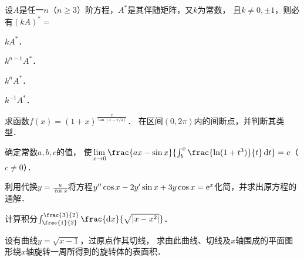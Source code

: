 \documentclass[plain,noanswer,medmath]{../../template/jnuexam}
\begin{document}
\begin{problem}
设$A$是任一$n$（$n \ge 3$）阶方程，$A^*$是其伴随矩阵，又$k$为常数，
且$k \ne 0, \pm 1$，则必有$(kA)^* =$\pickout{}
\begin{abcd}
\item $kA^*$．
\item $k^{n - 1}A^*$．
\item $k^n A^*$．
\item $k^{-1}A^*$．
\end{abcd}
\end{problem}



\begin{problem}
求函数$f(x) = \left(1 + x \right)^{\frac{x}{\tan(x - \pi /4)}}$．
在区间$\left(0,2\pi \right)$内的间断点，并判断其类型．
\end{problem}



\begin{problem}
确定常数$a,b,c$的值，
使$\lim_{x \to 0}\frac{ax-\sin x}{\int_b^x\frac{\ln(1 + t^3)}{t}\dt} = c$（$c \ne 0$）．
\end{problem}



\begin{problem}
利用代换$y = \frac{u}{\cos x}$将方程$y''\cos x - 2y'\sin x + 3y\cos x = \mathrm{e}^x$化简，并求出原方程的通解．
\end{problem}



\begin{problem}
计算积分$\int_{\frac{1}{2}}^{\frac{3}{2}} \frac{\dx}{\sqrt{\left| x - x^2 \right|}}$．
\end{problem}









\begin{problem}
设有曲线$y = \sqrt{x - 1}$，过原点作其切线，
求由此曲线、切线及$x$轴围成的平面图形绕$x$轴旋转一周所得到的旋转体的表面积．
\end{problem}


\end{document}
